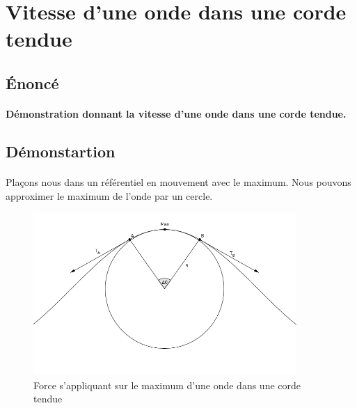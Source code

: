 \documentclass[a4paper]{article}
\begin{document}
\section{Vitesse d'une onde dans une corde tendue}
\subsection{Énoncé}
\paragraph{}\textbf{Démonstration donnant la vitesse d'une onde dans une corde tendue.}
\subsection{Démonstartion}
\paragraph{}Plaçons nous dans un référentiel en mouvement avec le maximum. Nous pouvons approximer le maximum de l'onde par un cercle. 
\begin{figure}
\begin{center}
\includegraphics[width=10cm]{imgs/tension.png}
\end{center}
\caption{Force s'appliquant sur le maximum d'une onde dans une corde tendue}
\label{Force s'appliquant sur le maximum d'une onde dans une corde tendue}
\end{figure}
\end{document}
